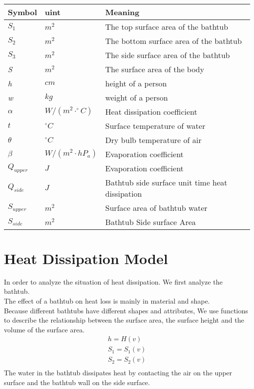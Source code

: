 \documentclass{mcmthesis}
\begin{document}
\begin{table}[H]
        \setlength{\abovecaptionskip}{0pt}
        \setlength{\belowcaptionskip}{0pt}
                 \\
        \begin{tabular}{p{2cm}|p{2cm}|p{10cm}}
        \hline
        \rowcolor[gray]{0.9}\bf{Symbol}	&\bf{uint}      &\bf{Meaning}\\
        \hline
        $S_{1}$		& $m^2  $		 & The top surface area of the bathtub 	\\
        $S_{2}$		& $m^2  $		 & The bottom surface area of the bathtub 	\\
        $S_{3}$		& $m^2  $		 & The side surface area of the bathtub 	\\
        \emph{S}	& $m^2  $		 & The surface area of the body\\
        \emph{h}	& $cm	$        & height of a person \\
        \emph{w}	& $kg	$        & weight of a person \\
        $\alpha$		& $ W/(m^{2}\cdot ^{\circ}C)  $		 & Heat dissipation coefficient\\
        $t$		& $ ^{\circ}C  $		 & Surface temperature of water \\
        $\theta$		& $^{\circ}C$		 & Dry bulb temperature of air\\
        $\beta$		& $W/(m^{2}\cdot hP_{a})$		 & Evaporation coefficient\\
        $Q_{upper}$		& $J$		 & Evaporation coefficient\\
		$Q_{side}$		& $J$		 & Bathtub side surface unit time heat dissipation\\
		$S_{upper}$		& $m^2$		 & Surface area of bathtub water\\
		$S_{side}$		& $m^2$		 & Bathtub Side surface Area\\

        \hline
        \end{tabular}
        \end{table}

\section{Heat Dissipation Model}
In order to analyze the situation of heat dissipation. 
We first analyze the bathtub.\\
\indent The effect of a bathtub on heat loss is mainly in material and shape.\\
\indent Because different bathtubs have different shapes and attributes, We use functions to describe the relationship between the surface area, the surface height and the volume of the surface area.
\begin{equation}
\begin{split}
h=H(v)  \\
S_{1}=S_{1}(v) \\
S_{2}=S_{2}(v)  \\
\end{split}
\end{equation}
\indent The water in the bathtub dissipates heat by contacting the air on the upper surface and the bathtub wall on the side surface.
\end{document}

